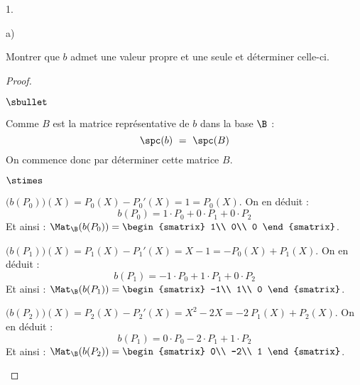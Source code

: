 \documentclass[11pt]{article}%
\begin{document}
\begin{noliste}{1.}


\item 
  \begin{noliste}{a)}
  \item Montrer que $b$ admet une valeur propre et une seule et
    déterminer celle-ci.
	
    \begin{proof}~
      \begin{noliste}{$\sbullet$}
      \item Comme $B$ est la matrice représentative de $b$ dans la
        base $\B$ :
        \[
        \spc(b) \ = \ \spc(B)
        \]
        On commence donc par déterminer cette matrice $B$.
        \begin{noliste}{$\stimes$}
	\item $\big( b(P_0) \big) (X) = P_0(X) - P_0'(X) = 1 =
          P_0(X)$. On en déduit :
          \[
          b(P_0) = 1 \cdot P_0 + 0 \cdot P_1 + 0 \cdot P_2
          \]
          Et ainsi : $\Mat_{\B}(b(P_0)) =
          \begin{smatrix}
            1\\
            0\\
            0
          \end{smatrix}$.
	
	\item $\big( b(P_1) \big) (X) = P_1(X) - P_1'(X) = X - 1 =
          -P_0(X) + P_1(X)$. On en déduit :
          \[
          b(P_1) = -1 \cdot P_0 + 1 \cdot P_1 + 0 \cdot P_2
          \]
          Et ainsi : $\Mat_{\B}(b(P_1)) =
          \begin{smatrix}
            -1\\
            1\\
            0
          \end{smatrix}$.

	\item $\big( b(P_2) \big) (X) = P_2(X) - P_2'(X) = X^2 - 2X =
          -2 \ P_1(X) + P_2(X)$. On en déduit :
          \[
          b(P_1) = 0 \cdot P_0 - 2 \cdot P_1 + 1 \cdot P_2
          \]
          Et ainsi : $\Mat_{\B}(b(P_2)) =
          \begin{smatrix}
            0\\
            -2\\
            1
          \end{smatrix}$.
	\end{noliste}


\end{noliste}
\end{proof}
\end{noliste}
\end{noliste}
\end{document}
